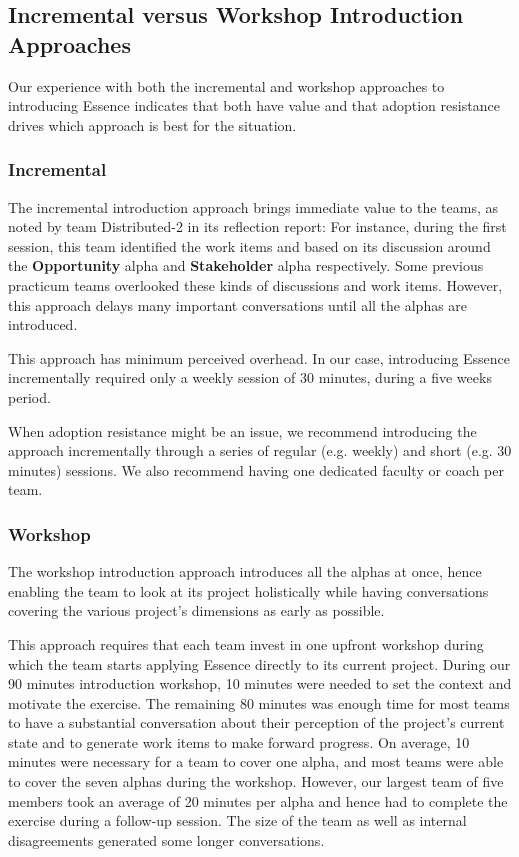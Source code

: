 \subsection{Incremental versus Workshop Introduction Approaches}

Our experience with both the incremental and workshop approaches to introducing Essence indicates that both have value and that adoption resistance drives which approach is best for the situation.

\subsubsection{Incremental}
The incremental introduction approach brings immediate value to the teams, as noted by team Distributed-2 in its reflection report:  For instance, during the first session, this team identified the work items  and  based on its discussion around the \textbf{Opportunity} alpha and \textbf{Stakeholder} alpha respectively. Some previous practicum teams overlooked these kinds of discussions and work items. However, this approach delays many important conversations until all the alphas are introduced.

This approach has minimum perceived overhead. In our case, introducing Essence incrementally required only a weekly session of 30 minutes, during a five weeks period.

When adoption resistance might be an issue, we recommend introducing the approach incrementally through a series of regular (e.g. weekly) and short (e.g. 30 minutes) sessions. We also recommend having one dedicated faculty or coach per team.

\subsubsection{Workshop}
The workshop introduction approach introduces all the alphas at once, hence enabling the team to look at its project holistically while having conversations covering the various project's dimensions as early as possible.

This approach requires that each team invest in one upfront workshop during which the team starts applying Essence directly to its current project. During our 90 minutes introduction workshop, 10 minutes were needed to set the context and motivate the exercise. The remaining 80 minutes was enough time for most teams to have a substantial conversation about their perception of the project's current state and to generate work items to make forward progress. On average, 10 minutes were necessary for a team to cover one alpha, and most teams were able to cover the seven alphas during the workshop. However, our largest team of five members took an average of 20 minutes per alpha and hence had to complete the exercise during a follow-up session. The size of the team as well as internal disagreements generated some longer conversations.

